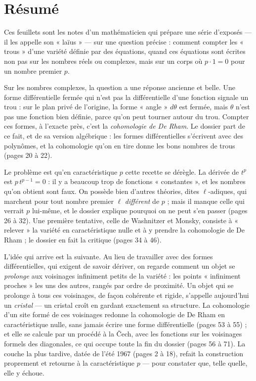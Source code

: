 \documentclass[11pt,a4paper]{article}
\begin{document}
\section*{Résumé}

\begin{resume}
Ces feuillets sont les notes d'un mathématicien qui prépare une série
d'exposés — il les appelle son « laïus » — sur une question précise : comment
compter les « trous » d'une variété définie par des équations, quand ces
équations sont écrites non pas sur les nombres réels ou complexes, mais sur un
corps où $p \cdot 1 = 0$ pour un nombre premier $p$.

Sur les nombres complexes, la question a une réponse ancienne et belle. Une
forme différentielle fermée qui n'est pas la différentielle d'une fonction
signale un trou : sur le plan privé de l'origine, la forme « angle » $d\theta$
est fermée, mais $\theta$ n'est pas une fonction bien définie, parce qu'on peut
tourner autour du trou. Compter ces formes, à l'exacte près, c'est la
\emph{cohomologie de De Rham}. Le dossier part de ce fait, et de sa version
algébrique : les formes différentielles s'écrivent avec des polynômes, et la
cohomologie qu'on en tire donne les bons nombres de trous (pages 20 à 22).

Le problème est qu'en caractéristique $p$ cette recette se dérègle. La
dérivée de $t^{p}$ est $p\,t^{p-1} = 0$ : il y a beaucoup trop de fonctions
« constantes », et les nombres qu'on obtient sont faux. On possède bien
d'autres théories, dites $\ell$-adiques, qui marchent pour tout nombre premier
$\ell$ \emph{différent} de $p$ ; mais il manque celle qui verrait $p$
lui-même, et le dossier explique pourquoi on ne peut s'en passer (pages 26 à
32). Une première tentative, celle de Washnitzer et Monsky, consiste à
« relever » la variété en caractéristique nulle et à y prendre la cohomologie
de De Rham ; le dossier en fait la critique (pages 34 à 46).

L'idée qui arrive est la suivante. Au lieu de travailler avec des formes
différentielles, qui exigent de savoir dériver, on regarde comment un objet se
\emph{prolonge} aux voisinages infiniment petits de la variété : les points
« infiniment proches » les uns des autres, rangés par ordre de proximité. Un
objet qui se prolonge à tous ces voisinages, de façon cohérente et rigide,
s'appelle aujourd'hui un \emph{cristal} — un cristal croît en gardant
exactement sa structure. La cohomologie d'un site formé de ces voisinages
redonne la cohomologie de De Rham en caractéristique nulle, sans jamais
écrire une forme différentielle (pages 53 à 55) ; et elle se calcule par un
procédé à la Čech, avec les fonctions sur les voisinages formels des
diagonales, ce qui occupe toute la fin du dossier (pages 56 à 71). La couche
la plus tardive, datée de l'été 1967 (pages 2 à 18), refait la construction
proprement et retourne à la caractéristique $p$ — pour constater que, telle
quelle, elle y échoue.


\end{resume}
\end{document}
